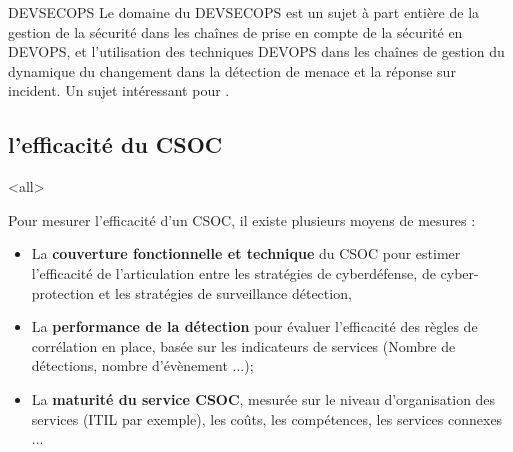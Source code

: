 \begin{techworkbox}{DEVSECOPS}
Le domaine du DEVSECOPS est un sujet à part entière de la gestion de la sécurité dans les chaînes de prise en compte de la sécurité  en DEVOPS, et l'utilisation des techniques DEVOPS dans les chaînes de gestion du dynamique du changement dans la détection de menace et la réponse sur incident. Un sujet intéressant pour \fichetech.
\end{techworkbox}
 
 \subsection{l'efficacité du CSOC}
 
\mode<all>{
 {
 Pour mesurer l’efficacité d'un CSOC, il existe plusieurs moyens de mesures  :
 \begin{itemize}

  \item La \textbf{couverture fonctionnelle et technique }du CSOC pour estimer l'efficacité  de l'articulation entre les stratégies de cyberdéfense, de cyber-protection et les stratégies de surveillance détection, 
  \item La \textbf{performance de la détection } pour évaluer l’efficacité des règles de corrélation en place, basée sur les indicateurs de services (Nombre de détections, nombre d'évènement ...);
  \item La \textbf{maturité du service CSOC}, mesurée sur le niveau d'organisation des services (ITIL par exemple), les coûts, les compétences, les services connexes ...
\end{itemize}
}} %


